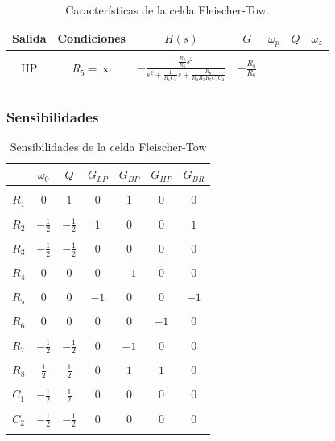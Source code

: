 \begin{table}[H] %
	\centering
	\begin{tabular}{c c c c }
		Salida & Condiciones & $H(s)$ & $G$ & $\omega_p$ & $Q$ & $\omega_z$\\
		\hline \\
		HP & $R_5=\infty$&$- \frac{\frac{R_8}{R_6}s^2}{s^2+\frac{1}{R_1C_1}s+\frac{R_8}{R_2R_3R_7C_1C_2}}$&$-\frac{R_8}{R_6}$\\ \\
		\hline
	\end{tabular}
	\caption{Caracter\'isticas de la celda Fleischer-Tow.}
	\label{f_cars}
\end{table}

\subsubsection{Sensibilidades}

\begin{table}[H]
	\centering
	\begin{tabular}{c c c c c c c}
		& $\omega_0$ & $Q$ &$G_{LP}$ & $G_{BP}$& $G_{HP}$& $G_{BR}$\\
		\hline \\ 
		$R_1$ & $0$ & $1$ & $0$ & $1$ & $0$ & $0$\\ \\
		$R_2$ & $-\frac{1}{2}$ & $-\frac{1}{2}$ & $1$ & $0$ & $0$ & $1$\\ \\
		$R_3$ & $-\frac{1}{2}$ & $-\frac{1}{2}$ & $0$ & $0$ & $0$ & $0$\\ \\
		$R_4$ & $0$ & $0$ & $0$ & $-1$ & $0$ & $0$\\ \\
		$R_5$ & $0$ & $0$ & $-1$ & $0$ & $0$ & $-1$\\ \\
		$R_6$ & $0$ & $0$ & $0$ & $0$ & $-1$ & $0$\\ \\
		$R_7$ & $-\frac{1}{2}$ & $-\frac{1}{2}$ & $0$ & $-1$ & $0$ & $0$\\ \\
		$R_8$ & $\frac{1}{2}$ & $\frac{1}{2}$ & $0$ & $1$ & $1$ & $0$\\ \\
		$C_1$ & $-\frac{1}{2}$ & $\frac{1}{2}$ & $0$ & $0$ & $0$ & $0$\\ \\
		$C_2$ & $-\frac{1}{2}$ & $-\frac{1}{2}$ & $0$ & $0$ & $0$ & $0$\\ \\
		\hline
	\end{tabular}
	\caption{Sensibilidades de la celda Fleischer-Tow}
	\label{sens_am}
\end{table}

